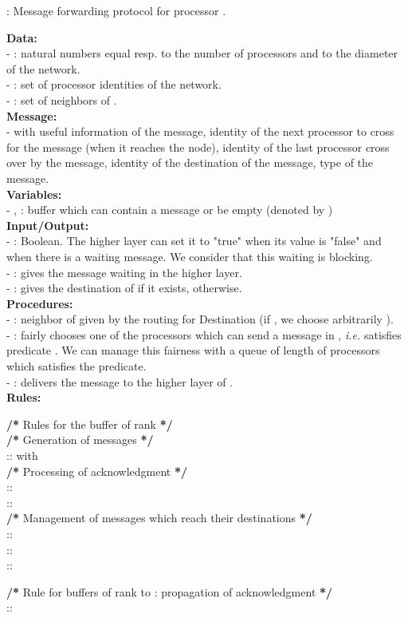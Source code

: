 \documentclass[11pt]{article}
\begin{document}
\begin{algorithm}
	\caption{\label{algo:AD}\AD : Message forwarding protocol for processor .}
\small{
		\textbf{Data:}\\
			-  : natural numbers equal resp. to the number of processors and to the diameter of the network.\\
			-  : set of processor identities of the network.\\
			-  : set of neighbors of .\\
		\textbf{Message:}\\
			-  with  useful information of the message, 
			identity of the next processor to cross for the message (when it reaches the node), 
			 identity of the last processor cross over by the message,  
			identity of the destination of the message,  type of the message.\\
		\textbf{Variables:}\\
			- ,  : buffer which can contain a message or be empty (denoted by )\\
		\textbf{Input/Output:}\\
			-  : Boolean. The higher layer can set it to "true" when its value is "false"
			and when there is a waiting message. We consider that this waiting is blocking.\\
			- : gives the message waiting in the higher layer.\\
			- : gives the destination of  if it exists,  otherwise.\\
		\textbf{Procedures:}\\
			- : neighbor of  given by the routing for Destination  (if , we choose arbitrarily ).\\
			- : fairly chooses one of the processors which can send a message
			in , \emph{i.e.}  satisfies predicate 
			. 
			We can manage this fairness with a queue of length  of processors which satisfies the
			predicate.\\
			- : delivers the message  to the higher layer
			of .\\
		\textbf{Rules:}
			\begin{description}
				\item \textbf{/*} Rules for the buffer of rank  \textbf{*/}\\
					\textbf{/*} Generation of messages \textbf{*/}\\
					 ::  with \\
					\textbf{/*} Processing of acknowledgment \textbf{*/}\\
					 ::  \\
					 ::  \\
					\textbf{/*} Management of messages which reach their destinations \textbf{*/}\\
					 ::  \\
					 ::  \\
					 :: 
				\item \textbf{/*} Rule for buffers of rank  to  : propagation of acknowledgment \textbf{*/}\\
					 :: 
					 

\end{description}}
\end{algorithm}
\end{document}
